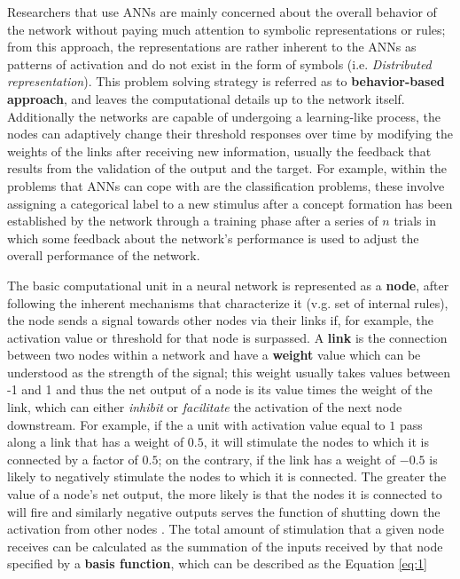\documentclass{WileySev}
\begin{document}
Researchers that use ANNs are mainly concerned about the overall behavior of the network without paying much attention to symbolic representations or rules; from this approach, the representations are rather inherent to the ANNs as patterns of activation and do not exist in the form of symbols (i.e. \textit{Distributed representation}). This problem solving strategy is referred as to \textbf{behavior-based approach}, and leaves the computational details up to the network itself. Additionally the networks are capable of undergoing a learning-like process, the nodes can adaptively change their threshold responses over time by modifying the weights of the links after receiving new information, usually the feedback that results from the validation of the output and the target. For example, within the problems that ANNs can cope with are the classification problems, these involve assigning a categorical label to a new stimulus after a concept formation has been established by the network through a training phase after a series of $n$ trials in which some feedback about the network's performance is used to adjust the overall performance of the network.

The basic computational unit in a neural network is represented as a \textbf{node}, after following the inherent mechanisms that characterize it (v.g. set of internal rules), the node sends a signal towards other nodes via their links if, for example, the activation value or threshold for that node is surpassed. A \textbf{link} is the connection between two nodes within a network and have a \textbf{weight} value which can be understood as the strength of the signal; this weight usually takes values between -1 and 1 and thus the net output of a node is its value times the weight of the link, which can either \textit{inhibit} or \textit{facilitate} the activation of the next node downstream. For example, if the a unit with activation value equal to $1$ pass along a link that has a weight of $0.5$, it will stimulate the nodes to which it is connected by a factor of $0.5$; on the contrary, if the link has a weight of $-0.5$ is likely to negatively stimulate the nodes to which it is connected. The greater the value of a node's net output, the more likely is that the nodes it is connected to will fire and similarly negative outputs serves the function of shutting down the activation from other nodes \cite[chap. 7]{friedenberg2011cognitive}. The total amount of stimulation that a given node receives can be calculated as the summation of the inputs received by that node specified by a \textbf{basis function}, which can be described as the Equation \ref{eq:1}
\end{document}
